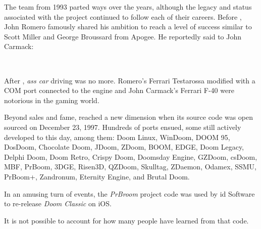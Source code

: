 The \doom{} team from 1993 parted ways over the years, although the legacy and status associated with the project continued to follow each of their careers. Before \doom{}, John Romero famously shared his ambition to reach a level of success similar to Scott Miller and George Broussard from Apogee. He reportedly said to John Carmack: \\
\par
 \\
 \par
After \doom{}, \textit{ass car} driving was no more. Romero's Ferrari Testarossa modified with a COM port connected to the engine and John Carmack's Ferrari F-40 were notorious in the gaming world.\\
\par
Beyond sales and fame, \doom{} reached a new dimension when its source code was open sourced on December 23, 1997. Hundreds of ports ensued, some still actively developed to this day, among them: Doom Linux, WinDoom, DOOM 95, DosDoom, Chocolate Doom, JDoom, ZDoom, BOOM, EDGE, Doom Legacy, Delphi Doom, Doom Retro, Crispy Doom, Doomsday Engine, GZDoom, csDoom, MBF, PrBoom, 3DGE, Risen3D, QZDoom, Skulltag, ZDaemon, Odamex, SSMU, PrBoom+, Zandronum, Eternity Engine, and Brutal Doom.\\
\par
 In an amusing turn of events, the \textit{PrBroom} project code was used by id Software to re-release \textit{Doom Classic} on iOS.\\
\par
It is not possible to account for how many people have learned from that code. 


